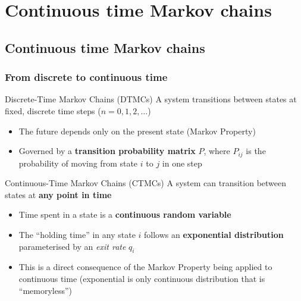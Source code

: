 \documentclass[aspectratio=169]{beamer}
\begin{document}
\section{Continuous time Markov chains}

\subsection{Continuous time Markov chains}
\begin{frame}
    \frametitle{From discrete to continuous time}
    \begin{block}{Discrete-Time Markov Chains (DTMCs)}
        A system transitions between states at fixed, discrete time steps ($n=0, 1, 2, \dots$)
        \begin{itemize}
            \item The future depends only on the present state (Markov Property)
            \item Governed by a \textbf{transition probability matrix} $P$, where $P_{ij}$ is the probability of moving from state $i$ to $j$ in one step
        \end{itemize}
    \end{block}
    
    \begin{block}{Continuous-Time Markov Chains (CTMCs)}
        A system can transition between states at \textbf{any point in time}
        \begin{itemize}
            \item Time spent in a state is a \textbf{continuous random variable}
            \item The ``holding time'' in any state $i$ follows an \textbf{exponential distribution} parameterised by an \textit{exit rate} $q_i$
            \item This is a direct consequence of the Markov Property being applied to continuous time (exponential is only continuous distribution that is ``memoryless'')
        \end{itemize}
    \end{block}
\end{frame}
\end{document}

